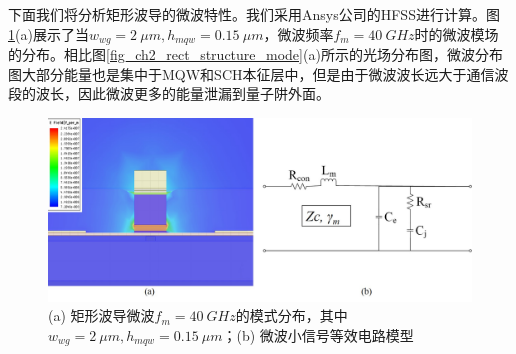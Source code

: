 下面我们将分析矩形波导的微波特性。我们采用Ansys公司的HFSS进行计算\cite{ansyshfss}。图\ref{fig_ch2_rect_microwave_mode_equal_circuits}(a)展示了当$w_{wg} =2~\mu m, h_{mqw} = 0.15~\mu m$，微波频率$f_m = 40~ GHz$时的微波模场的分布。相比图\ref{fig_ch2_rect_structure_mode}(a)所示的光场分布图，微波分布图大部分能量也是集中于MQW和SCH本征层中，但是由于微波波长远大于通信波段的波长，因此微波更多的能量泄漏到量子阱外面。
\begin{figure}[htb]
	\centering
	\includegraphics[width=12cm]{./Pictures/fig_ch2_rect_microwave_mode_equal_circuits.jpg}
	\caption{(a) 矩形波导微波$f_m = 40~GHz$的模式分布，其中$w_{wg} = 2~\mu m, h_{mqw} = 0.15~\mu m$；(b) 微波小信号等效电路模型}
	\label{fig_ch2_rect_microwave_mode_equal_circuits}
\end{figure}

